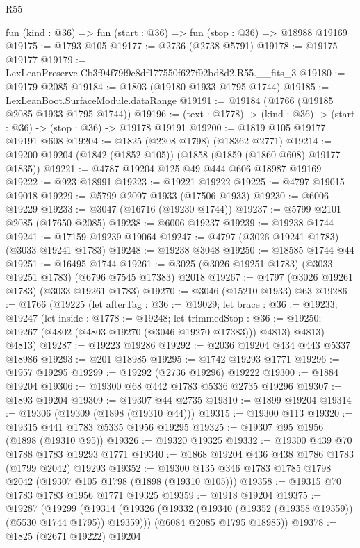 \begin{lexlean}{R55}
\begin{coremodule}
  fun (kind : @36) => fun (start : @36) => fun (stop : @36) => @18988 @19169
@19175 := @1793 @105
@19177 := @2736 (@2738 @5791)
@19178 := @19175 @19177
@19179 := LexLeanPreserve.Cb3f94f79f9e8df177550f627f92bd8d2.R55.__fits_3
@19180 := @19179 @2085
@19184 := @1803 (@19180 @1933 @1795 @1744)
@19185 := LexLeanBoot.SurfaceModule.dataRange
@19191 := @19184 (@1766 (@19185 @2085 @1933 @1795 @1744))
@19196 := (text : @1778) -> (kind : @36) -> (start : @36) -> (stop : @36) -> @19178 @19191
@19200 := @1819 @105 @19177 @19191 @608
@19204 := @1825 (@2208 @1798) (@18362 @2771)
@19214 := @19200 @19204 (@1842 (@1852 @105)) (@1858 (@1859 (@1860 @608) @19177 @1835))
@19221 := @4787 @19204 @125 @49 @444 @606 @18987 @19169
@19222 := @923 @18991
@19223 := @19221 @19222
@19225 := @4797 @19015 @19018
@19229 := @5799 @2097 @1933 (@17506 @1933)
@19230 := @6006 @19229
@19233 := @3047 (@16716 (@19230 @1744))
@19237 := @5799 @2101 @2085 (@17650 @2085)
@19238 := @6006 @19237
@19239 := @19238 @1744
@19241 := @17159 @19239 @19064
@19247 := @4797 (@3026 @19241 @1783) (@3033 @19241 @1783)
@19248 := @19238 @3048
@19250 := @18585 @1744 @44
@19251 := @16495 @1744
@19261 := @3025 (@3026 @19251 @1783) (@3033 @19251 @1783) (@6796 @7545 @17383) @2018
@19267 := @4797 (@3026 @19261 @1783) (@3033 @19261 @1783)
@19270 := @3046 (@15210 @1933) @63
@19286 := @1766
    (@19225
      (let afterTag : @36 := @19029;
      let brace : @36 := @19233;
      @19247
        (let inside : @1778 := @19248;
        let trimmedStop : @36 := @19250; @19267 (@4802 (@4803 @19270 (@3046 @19270 @17383))) @4813)
        @4813)
      @4813)
@19287 := @19223 @19286
@19292 := @2036 @19204 @434 @443 @5337 @18986
@19293 := @201 @18985
@19295 := @1742 @19293 @1771
@19296 := @1957 @19295
@19299 := @19292 (@2736 @19296) @19222
@19300 := @1884 @19204
@19306 := @19300 @68 @442 @1783 @5336 @2735 @19296
@19307 := @1893 @19204
@19309 := @19307 @44 @2735
@19310 := @1899 @19204
@19314 := @19306 (@19309 (@1898 (@19310 @44)))
@19315 := @19300 @113
@19320 := @19315 @441 @1783 @5335 @1956 @19295
@19325 := @19307 @95 @1956 (@1898 (@19310 @95))
@19326 := @19320 @19325
@19332 := @19300 @439 @70 @1788 @1783 @19293 @1771
@19340 := @1868 @19204 @436 @438 @1786 @1783 (@1799 @2042) @19293
@19352 := @19300 @135 @346 @1783 @1785 @1798 @2042 (@19307 @105 @1798 (@1898 (@19310 @105)))
@19358 := @19315 @70 @1783 @1783 @1956 @1771 @19325
@19359 := @1918 @19204
@19375 := @19287
    (@19299
      (@19314 (@19326 (@19332 (@19340 (@19352 (@19358 @19359)) (@5530 @1744 @1795)) @19359)))
      (@6084 @2085 @1795 @18985))
@19378 := @1825 (@2671 @19222) @19204

\end{coremodule}
\end{lexlean}
